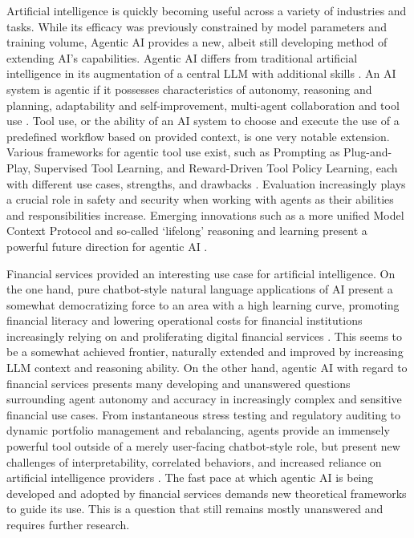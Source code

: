 \documentclass[12pt]{article}
\begin{document}
Artificial intelligence is quickly becoming useful across a variety of industries and tasks. While its efficacy was previously constrained by model parameters and training volume, Agentic AI provides a new, albeit still developing method of extending AI’s capabilities. Agentic AI differs from traditional artificial intelligence in its augmentation of a central LLM with additional skills \parencite{Hu2026AgenticModels}. An AI system is agentic if it possesses characteristics of autonomy, reasoning and planning, adaptability and self-improvement, multi-agent collaboration and tool use \parencite{Aldridge2026AgenticSurvey}. Tool use, or the ability of an AI system to choose and execute the use of a predefined workflow based on provided context, is one very notable extension. Various frameworks for agentic tool use exist, such as Prompting as Plug-and-Play, Supervised Tool Learning, and Reward-Driven Tool Policy Learning, each with different use cases, strengths, and drawbacks \parencite{Hu2026AgenticModels}. Evaluation increasingly plays a crucial role in safety and security when working with agents as their abilities and responsibilities increase. Emerging innovations such as a more unified Model Context Protocol and so-called ‘lifelong’ reasoning and learning present a powerful future direction for agentic AI \parencite{Hu2026AgenticModels}.

Financial services provided an interesting use case for artificial intelligence. On the one hand, pure chatbot-style natural language applications of AI present a somewhat democratizing force to an area with a high learning curve, promoting financial literacy and lowering operational costs for financial institutions increasingly relying on and proliferating digital financial services \parencite{ReddyMitta2022AI-PoweredRecommendations}. This seems to be a somewhat achieved frontier, naturally extended and improved by increasing LLM context and reasoning ability. On the other hand, agentic AI with regard to financial services presents many developing and unanswered questions surrounding agent autonomy and accuracy in increasingly complex and sensitive financial use cases. From instantaneous stress testing and regulatory auditing to dynamic portfolio management and rebalancing, agents provide an immensely powerful tool outside of a merely user-facing chatbot-style role, but present new challenges of interpretability, correlated behaviors, and increased reliance on artificial intelligence providers \parencite{Aldridge2026AgenticSurvey}. The fast pace at which agentic AI is being developed and adopted by financial services demands new theoretical frameworks to guide its use. This is a question that still remains mostly unanswered and requires further research.
\end{document}
